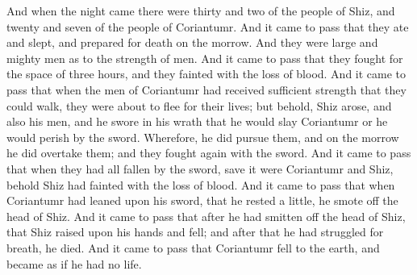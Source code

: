 And when the night came there were thirty and two of the people of Shiz, and twenty and seven of the people of Coriantumr.
\bverse \iffalse And it came to pass that they ate and slept, and prepared for death on the morrow. And they were large and mighty men as to the strength of men. \fi
And it came to pass that they ate and slept, and prepared for death on the morrow. And they were large and mighty men as to the strength of men.
\bverse \iffalse And it came to pass that they fought for the space of three hours, and they fainted with the loss of blood. \fi
And it came to pass that they fought for the space of three hours, and they fainted with the loss of blood.
\bverse \iffalse And it came to pass that when the men of Coriantumr had received sufficient strength that they could walk, they were about to flee for their lives; but behold, Shiz arose, and also his men, and he swore in his wrath that he would slay Coriantumr or he would perish by the sword. \fi
And it came to pass that when the men of Coriantumr had received sufficient strength that they could walk, they were about to flee for their lives; but behold, Shiz arose, and also his men, and he swore in his wrath that he would slay Coriantumr or he would perish by the sword.
\bverse \iffalse Wherefore, he did pursue them, and on the morrow he did overtake them; and they fought again with the sword. And it came to pass that when they had all fallen by the sword, save it were Coriantumr and Shiz, behold Shiz had fainted with the loss of blood. \fi
Wherefore, he did pursue them, and on the morrow he did overtake them; and they fought again with the sword. And it came to pass that when they had all fallen by the sword, save it were Coriantumr and Shiz, behold Shiz had fainted with the loss of blood.
\bverse \iffalse And it came to pass that when Coriantumr had leaned upon his sword, that he rested a little, he smote off the head of Shiz. \fi
And it came to pass that when Coriantumr had leaned upon his sword, that he rested a little, he smote off the head of Shiz.
\bverse \iffalse And it came to pass that after he had smitten off the head of Shiz, that Shiz raised upon his hands and fell; and after that he had struggled for breath, he died. \fi
And it came to pass that after he had smitten off the head of Shiz, that Shiz raised upon his hands and fell; and after that he had struggled for breath, he died.
\bverse \iffalse And it came to pass that Coriantumr fell to the earth, and became as if he had no life. \fi
And it came to pass that Coriantumr fell to the earth, and became as if he had no life.
